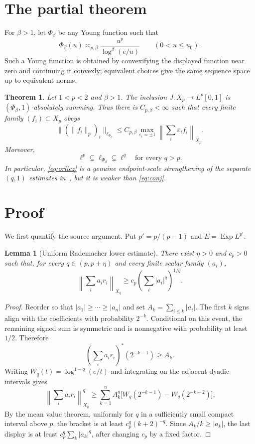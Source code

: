 \documentclass[11pt]{article}
\newtheorem{theorem}{Theorem}
\newtheorem{lemma}{Lemma}
\newcommand{\eps}{\varepsilon}
\begin{document}
\section{The partial theorem}

For $\beta>1$, let $\Phi_\beta$ be any Young function such that
\begin{equation}\label{eq:phi}
 \Phi_\beta(u)\asymp_{p,\beta}
 \frac{u^p}{\log^\beta(e/u)}\qquad(0<u\le u_0).
\end{equation}
Such a Young function is obtained by convexifying the displayed function near
zero and continuing it convexly; equivalent choices give the same sequence
space up to equivalent norms.

\begin{theorem}\label{thm:main}
Let $1<p<2$ and $\beta>1$.  The inclusion
$J:X_p\to L^p[0,1]$ is $(\Phi_\beta,1)$-absolutely summing.  Thus there is
$C_{p,\beta}<\infty$ such that every finite family $(f_i)\subset X_p$ obeys
\begin{equation}\label{eq:orlicz}
 \big\|(\|f_i\|_p)_i\big\|_{\ell_{\Phi_\beta}}
 \le C_{p,\beta}\max_{\eps_i=\pm1}
 \left\|\sum_i\eps_i f_i\right\|_{X_p}.
\end{equation}
Moreover,
\[
 \ell^p\subsetneq\ell_{\Phi_\beta}\subsetneq\ell^q
 \quad\text{for every }q>p.
\]
In particular, \eqref{eq:orlicz} is a genuine endpoint-scale strengthening of
the separate $(q,1)$ estimates in~\cite{ALW}, but it is weaker than
\eqref{eq:conj}.
\end{theorem}

\section{Proof}

We first quantify the source argument.  Put $p'=p/(p-1)$ and
$E=\operatorname{Exp}L^{p'}$.

\begin{lemma}[Uniform Rademacher lower estimate]\label{lem:rad}
There exist $\eta>0$ and $c_p>0$ such that, for every
$q\in(p,p+\eta)$ and every finite scalar family $(a_i)$,
\[
 \left\|\sum_i a_i r_i\right\|_{X_q}
 \ge c_p\left(\sum_i|a_i|^q\right)^{1/q}.
\]
\end{lemma}

\begin{proof}
Reorder so that $|a_1|\ge\cdots\ge|a_n|$ and set
$A_k=\sum_{i\le k}|a_i|$.  The first $k$ signs align with the coefficients
with probability $2^{-k}$.  Conditional on this event, the remaining signed
sum is symmetric and is nonnegative with probability at least $1/2$.
Therefore
\[
 \left(\sum_i a_i r_i\right)^*(2^{-k-1})\ge A_k.
\]
Writing $W_q(t)=\log^{1-q}(e/t)$ and integrating on the adjacent dyadic
intervals gives
\[
 \left\|\sum_i a_i r_i\right\|_{X_q}^q
 \ge \sum_{k=1}^n A_k^q
 \bigl[W_q(2^{-k-1})-W_q(2^{-k-2})\bigr].
\]
By the mean value theorem, uniformly for $q$ in a sufficiently small compact
interval above $p$, the bracket is at least $c_p^q(k+2)^{-q}$.  Since
$A_k/k\ge |a_k|$, the last display is at least
$c_p^q\sum_k|a_k|^q$, after changing $c_p$ by a fixed factor.
\end{proof}
\end{document}
